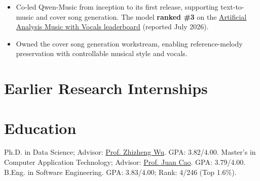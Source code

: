 \documentclass{resume}
\begin{document}
\par\vspace{0.6em}
\par
\begin{itemize}
  \raggedright
  \item Co-led Qwen-Music from inception to its first release, supporting text-to-music and cover song generation. The model \textbf{ranked \#3} on the \href{https://arxiv.org/html/2607.11699v1}{Artificial Analysis Music with Vocals leaderboard} (reported July 2026).
  \item Owned the cover song generation workstream, enabling reference-melody preservation with controllable musical style and vocals.
\end{itemize}

\section{Earlier Research Internships}
{\small {}
}

{\small {}
}

{\small {}
}

\section{Education}
{\small Ph.D. in Data Science; Advisor: \href{https://scholar.google.com/citations?user=K6zhweAAAAAJ&hl=en}{Prof. Zhizheng Wu}. GPA: 3.82/4.00.}
{\small Master's in Computer Application Technology; Advisor: \href{https://scholar.google.com/citations?user=fSBdNg0AAAAJ&hl=zh-CN}{Prof. Juan Cao}. GPA: 3.79/4.00.}
{\small B.Eng. in Software Engineering. GPA: 3.83/4.00; Rank: 4/246 (Top 1.6\%).}
\end{document}
